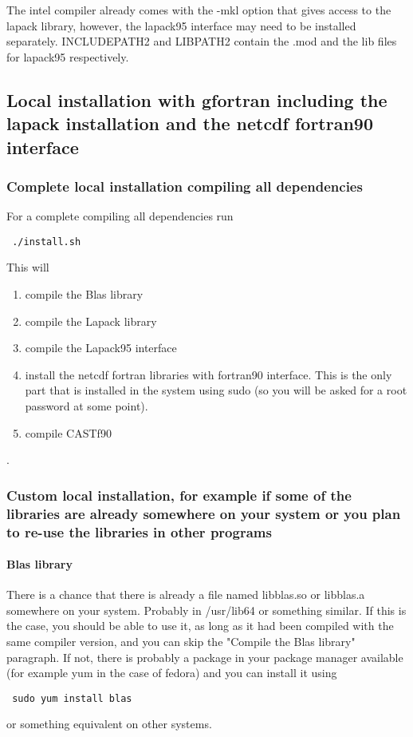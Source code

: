 \documentclass[11p,a4paper]{article}
\begin{document}
The intel compiler already comes with the -mkl option that gives access to the lapack library, however, the lapack95 interface may need to be installed separately. INCLUDEPATH2 and LIBPATH2 contain the .mod and the lib files for lapack95 respectively. 


\subsection{Local installation with gfortran including the lapack installation and the netcdf fortran90 interface}
\subsubsection{Complete local installation compiling all dependencies}
For a complete compiling all dependencies run
\begin{verbatim}
 ./install.sh
\end{verbatim}
This will 
\begin{enumerate}
 \item compile the Blas library
 \item compile the Lapack library
 \item compile the Lapack95 interface
 \item install the netcdf fortran libraries with fortran90 interface. This is the only part that is installed in the system using sudo (so you will be asked for a root password at some point).
 \item compile CASTf90
\end{enumerate}.
\subsubsection{Custom local installation, for example if some of the libraries are already somewhere on your system or you plan to re-use the libraries in other programs}
\paragraph{Blas library}
There is a chance that there is already a file named libblas.so or libblas.a somewhere on your system. Probably in /usr/lib64 or something similar. If this is the case, you should be able to use it, as long as it had been compiled with the same compiler version, and you can skip the "Compile the Blas library" paragraph. If not, there is probably a package in your package manager available (for example yum in the case of fedora) and you can install it using
\begin{verbatim}
 sudo yum install blas
\end{verbatim}
or something equivalent on other systems.
\end{document}
